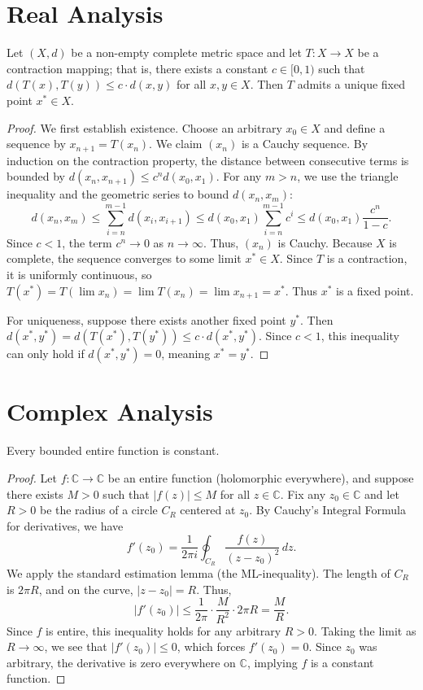 \documentclass[11pt]{scrartcl}
\begin{document}
\section{Real Analysis}

\begin{theorem}
    Let $(X, d)$ be a non-empty complete metric space and let $T \colon X \to X$ be a contraction mapping; that is, there exists a constant $c \in [0, 1)$ such that $d(T(x), T(y)) \le c \cdot d(x, y)$ for all $x, y \in X$. Then $T$ admits a unique fixed point $x^* \in X$.
\end{theorem}
\begin{proof}
    We first establish existence. Choose an arbitrary $x_0 \in X$ and define a sequence by $x_{n+1} = T(x_n)$. We claim $(x_n)$ is a Cauchy sequence. By induction on the contraction property, the distance between consecutive terms is bounded by $d(x_n, x_{n+1}) \le c^n d(x_0, x_1)$.
    For any $m > n$, we use the triangle inequality and the geometric series to bound $d(x_n, x_m)$:
    \[ d(x_n, x_m) \le \sum_{i=n}^{m-1} d(x_i, x_{i+1}) \le d(x_0, x_1) \sum_{i=n}^{m-1} c^i \le d(x_0, x_1) \frac{c^n}{1-c}. \]
    Since $c < 1$, the term $c^n \to 0$ as $n \to \infty$. Thus, $(x_n)$ is Cauchy. Because $X$ is complete, the sequence converges to some limit $x^* \in X$. Since $T$ is a contraction, it is uniformly continuous, so $T(x^*) = T(\lim x_n) = \lim T(x_n) = \lim x_{n+1} = x^*$. Thus $x^*$ is a fixed point.
    
    For uniqueness, suppose there exists another fixed point $y^*$. Then $d(x^*, y^*) = d(T(x^*), T(y^*)) \le c \cdot d(x^*, y^*)$. Since $c < 1$, this inequality can only hold if $d(x^*, y^*) = 0$, meaning $x^* = y^*$.
\end{proof}

\section{Complex Analysis}

\begin{theorem}
    Every bounded entire function is constant.
\end{theorem}
\begin{proof}
    Let $f \colon \mathbb{C} \to \mathbb{C}$ be an entire function (holomorphic everywhere), and suppose there exists $M > 0$ such that $|f(z)| \le M$ for all $z \in \mathbb{C}$. 
    Fix any $z_0 \in \mathbb{C}$ and let $R > 0$ be the radius of a circle $C_R$ centered at $z_0$. By Cauchy's Integral Formula for derivatives, we have
    \[ f'(z_0) = \frac{1}{2\pi i} \oint_{C_R} \frac{f(z)}{(z-z_0)^2} \, dz. \]
    We apply the standard estimation lemma (the ML-inequality). The length of $C_R$ is $2\pi R$, and on the curve, $|z - z_0| = R$. Thus,
    \[ |f'(z_0)| \le \frac{1}{2\pi} \cdot \frac{M}{R^2} \cdot 2\pi R = \frac{M}{R}. \]
    Since $f$ is entire, this inequality holds for any arbitrary $R > 0$. Taking the limit as $R \to \infty$, we see that $|f'(z_0)| \le 0$, which forces $f'(z_0) = 0$. Since $z_0$ was arbitrary, the derivative is zero everywhere on $\mathbb{C}$, implying $f$ is a constant function.
\end{proof}
\end{document}
